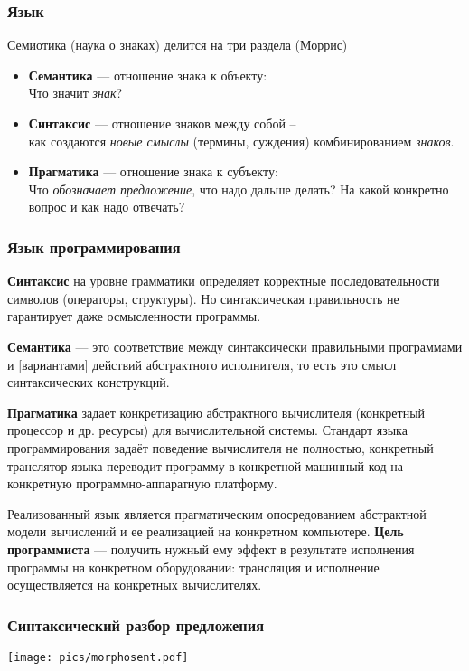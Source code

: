\documentclass[10pt]{beamer}
\begin{document}
\begin{frame}
  \frametitle{Язык}
  \begin{block}{Семиотика (наука о знаках) делится на три раздела (Моррис)}
  \begin{itemize}
  \item \textbf{Семантика} — отношение знака к объекту: \\ Что значит \emph{знак}?
  \item \textbf{Синтаксис} — отношение знаков между собой --\\ как создаются \emph{новые смыслы} (термины, суждения) комбинированием \emph{знаков}.
  \item \textbf{Прагматика} — отношение знака к субъекту:\\ Что \emph{обозначает предложение}, что надо дальше делать? На какой конкретно вопрос и как надо отвечать?
  \end{itemize}
\end{block}
\end{frame}

\begin{frame}
  \frametitle{Язык программирования}
\textbf{Синтаксис} на уровне грамматики определяет корректные последовательности символов (операторы, структуры). Но синтаксическая правильность не гарантирует даже осмысленности программы. %

\textbf{Семантика} — это соответствие между синтаксически правильными программами и [вариантами] действий абстрактного исполнителя, то есть это смысл синтаксических конструкций.

\textbf{Прагматика} задает конкретизацию абстрактного вычислителя (конкретный процессор и др. ресурсы) для  вычислительной системы. Стандарт языка программирования задаёт поведение вычислителя не полностью, конкретный транслятор языка переводит программу в конкретной машинный код на конкретную программно-аппаратную платформу.

Реализованный язык является прагматическим опосредованием абстрактной модели вычислений и ее реализацией на конкретном компьютере.
\vfill
\textbf{Цель программиста} — получить нужный ему эффект в результате исполнения программы на конкретном оборудовании: трансляция и исполнение осуществляется на конкретных вычислителях.

\end{frame}

\begin{frame}
  \frametitle{Синтаксический разбор предложения}
  \begin{center}
    \texttt{[image: pics/morphosent.pdf]}
  \end{center}
\end{frame}
\end{document}
